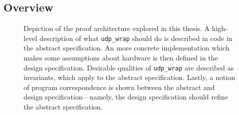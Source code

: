 \documentclass[twoside]{memoir}
\begin{document}
\subsection{Overview}
\begin{figure}[h]
    \centering
    \caption{Depiction of the proof architecture explored in this thesis.
    A high-level description of what \lstinline{udp_wrap} should do
    is described in code in the abstract specification.
    An more concrete implementation which makes some assumptions about hardware
    is then defined in the design specification.
    Desirable qualities of \lstinline{udp_wrap} are described as invariants,
    which apply to the abstract specification.
    Lastly, a notion of program correspondence is shown between the
    abstract and design specification---namely, the design specification
    should refine the abstract specification.
    }
    \label{fig:proof-structure-abstract-design}
\end{figure}
\end{document}
